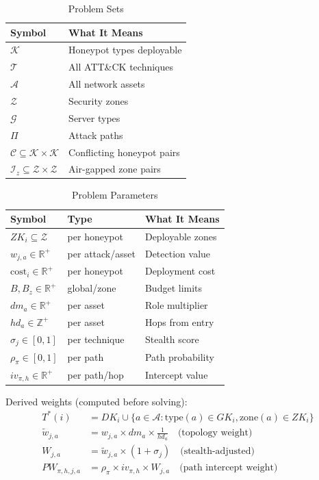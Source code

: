 \documentclass[journal]{IEEEtran}
\newcommand{\tildeW}{\tilde{w}}
\newcommand{\calK}{\mathcal{K}}
\newcommand{\calT}{\mathcal{T}}
\newcommand{\calA}{\mathcal{A}}
\newcommand{\calZ}{\mathcal{Z}}
\newcommand{\calG}{\mathcal{G}}
\newcommand{\calC}{\mathcal{C}}
\newcommand{\calPi}{\mathcal{\Pi}}
\begin{document}
\begin{table}[htbp]
\caption{Problem Sets}
\label{tab:sets}
\centering\renewcommand{\arraystretch}{1.2}
\begin{tabular}{@{}ll@{}}
\toprule
\textbf{Symbol} & \textbf{What It Means} \\
\midrule
$\calK$ & Honeypot types deployable \\
$\calT$ & All ATT\&CK techniques \\
$\calA$ & All network assets \\
$\calZ$ & Security zones \\
$\calG$ & Server types \\
$\calPi$ & Attack paths \\
$\calC\subseteq\calK\times\calK$ & Conflicting honeypot pairs \\
$\mathcal{I}_z\subseteq\calZ\times\calZ$ & Air-gapped zone pairs \\
\bottomrule
\end{tabular}
\end{table}

\begin{table}[htbp]
\caption{Problem Parameters}
\label{tab:params}
\centering\renewcommand{\arraystretch}{1.2}
\begin{tabular}{@{}lll@{}}
\toprule
\textbf{Symbol} & \textbf{Type} & \textbf{What It Means} \\
\midrule
$ZK_i\subseteq\calZ$  & per honeypot & Deployable zones \\
$w_{j,a}\in\mathbb{R}^+$ & per attack/asset & Detection value \\
$\mathrm{cost}_i\in\mathbb{R}^+$ & per honeypot & Deployment cost \\
$B,B_z\in\mathbb{R}^+$ & global/zone & Budget limits \\
$dm_a\in\mathbb{R}^+$ & per asset & Role multiplier \\
$hd_a\in\mathbb{Z}^+$ & per asset & Hops from entry \\
$\sigma_j\in[0,1]$ & per technique & Stealth score \\
$\rho_\pi\in[0,1]$ & per path & Path probability \\
$iv_{\pi,h}\in\mathbb{R}^+$ & per path/hop & Intercept value \\
\bottomrule
\end{tabular}
\end{table}

Derived weights (computed before solving):
\begin{align}
  T^*(i) &= DK_i \cup \{a\in\calA:\mathrm{type}(a)\in GK_i,
             \mathrm{zone}(a)\in ZK_i\} \\
  \tildeW_{j,a} &= w_{j,a}\times dm_a\times\tfrac{1}{hd_a}
    \quad\text{(topology weight)} \\
  W_{j,a} &= \tildeW_{j,a}\times(1+\sigma_j)
    \quad\text{(stealth-adjusted)} \\
  PW_{\pi,h,j,a} &= \rho_\pi\times iv_{\pi,h}\times W_{j,a}
    \quad\text{(path intercept weight)}
\end{align}
\end{document}
